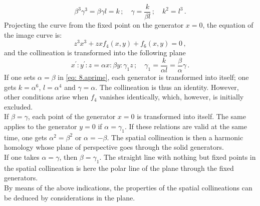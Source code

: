 \documentclass[leqno]{article}
\begin{document}
\begin{equation}\label{eq: 8.b}
\beta^3 \gamma^3 = \beta \gamma l = k \, ; \quad \gamma = \frac{k}{\beta l} \, ; \quad k^2 = l^3 \, . \tag{b} 
\end{equation}
Projecting the curve from the fixed point on the generator $x=0$, the equation of the image curve is: 
\[
z^3 x^3 + zx f_4(x, y) + f_6(x, y) = 0 \, , 
\] 
and the collineation is transformed into the following plane
\begin{equation}\label{eq: 8.a1prime}
x^\prime : y^\prime : z = \alpha x : \beta y : \gamma_1 z \, ; \quad \gamma_1 = \frac{k}{\alpha l} = \frac{\beta}{\alpha} \gamma \, . \tag{$a_1^\prime$}
\end{equation}
If one sets $\alpha=\beta$ in \eqref{eq: 8.aprime}, each generator is transformed into itself; one gets $k=\alpha^6$, $l=\alpha^4$ and $\gamma=\alpha$. The collineation is thus an identity. However, other conditions arise when $f_4$ vanishes identically, which, however, is initially excluded. \\
If $\beta = \gamma$, each point of the generator $x=0$ is transformed into itself. The same applies to the generator $y=0$ if $\alpha = \gamma_1$. If these relations are valid at the same time, one gets $\alpha^2 = \beta^2$ or $\alpha=-\beta$. The spatial collineation is then a harmonic homology whose plane of perspective goes through the solid generators. \\
If one takes $\alpha = \gamma$, then $\beta = \gamma_1$. The straight line with nothing but fixed points in the spatial collineation is here the polar line of the plane through the fixed generators. \\
By means of the above indications, the properties of the spatial collineations can be deduced by considerations in the plane.
\end{document}
